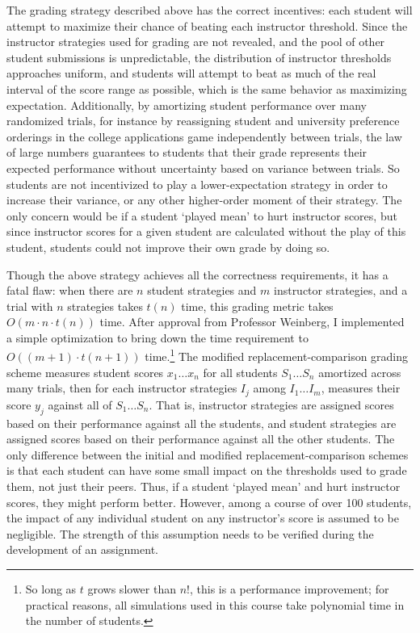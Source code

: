 \documentclass[pageno]{jpaper}
\begin{document}
The grading strategy described above has the correct incentives: each student will attempt to maximize their chance of beating each instructor threshold.
Since the instructor strategies used for grading are not revealed, and the pool of other student submissions is unpredictable, the distribution of instructor thresholds approaches uniform, and students will attempt to beat as much of the real interval of the score range as possible, which is the same behavior as maximizing expectation.
Additionally, by amortizing student performance over many randomized trials, for instance by reassigning student and university preference orderings in the college applications game independently between trials, the law of large numbers guarantees to students that their grade represents their expected performance without uncertainty based on variance between trials.
So students are not incentivized to play a lower-expectation strategy in order to increase their variance, or any other higher-order moment of their strategy.
The only concern would be if a student `played mean' to hurt instructor scores, but since instructor scores for a given student are calculated without the play of this student, students could not improve their own grade by doing so.

Though the above strategy achieves all the correctness requirements, it has a fatal flaw: when there are $n$ student strategies and $m$ instructor strategies, and a trial with $n$ strategies takes $t(n)$ time, this grading metric takes $O(m \cdot n \cdot t(n))$ time.
After approval from Professor Weinberg, I implemented a simple optimization to bring down the time requirement to $O((m+1) \cdot t(n+1))$ time.\footnote{So long as $t$ grows slower than $n! $, this is a performance improvement; for practical reasons, all simulations used in this course take polynomial time in the number of students.}
The modified replacement-comparison grading scheme measures student scores $x_1 \ldots x_n$ for all students $S_1 \ldots S_n$ amortized across many trials, then for each instructor strategies $I_j$ among $I_1 \ldots I_m$, measures their score $y_j$ against all of $S_1 \ldots S_n$.
That is, instructor strategies are assigned scores based on their performance against all the students, and student strategies are assigned scores based on their performance against all the other students.
The only difference between the initial and modified replacement-comparison schemes is that each student can have some small impact on the thresholds used to grade them, not just their peers.
Thus, if a student `played mean' and hurt instructor scores, they might perform better.
However, among a course of over 100 students, the impact of any individual student on any instructor's score is assumed to be negligible.
The strength of this assumption needs to be verified during the development of an assignment.
\end{document}
